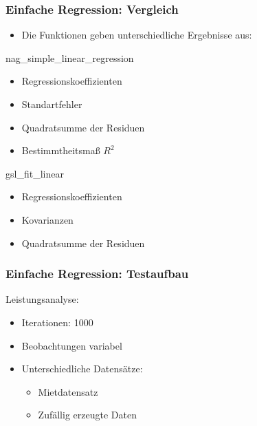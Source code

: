 \documentclass{beamer}
\begin{document}
\begin{frame}
  \frametitle{Einfache Regression: Vergleich}
  
  \begin{itemize}
  \item Die Funktionen geben unterschiedliche Ergebnisse aus:
  \end{itemize}

  \begin{block}{nag\_simple\_linear\_regression}
    \begin{itemize}
    \item Regressionskoeffizienten
    \item Standartfehler
    \item Quadratsumme der Residuen
    \item Bestimmtheitsmaß $R^2$
    \end{itemize}
  \end{block}

  \begin{block}{gsl\_fit\_linear}
    \begin{itemize}
    \item Regressionskoeffizienten
    \item Kovarianzen
    \item Quadratsumme der Residuen
    \end{itemize}
  \end{block}

\end{frame}

\begin{frame}
  \frametitle{Einfache Regression: Testaufbau}

  \begin{block}{Leistungsanalyse:}
    \begin{itemize}
    \item Iterationen: 1000
    \item Beobachtungen variabel
    \item Unterschiedliche Datensätze:
      \begin{itemize}
      \item Mietdatensatz
      \item Zufällig erzeugte Daten
      \end{itemize}
    \end{itemize}
  \end{block}

\end{frame}
\end{document}
